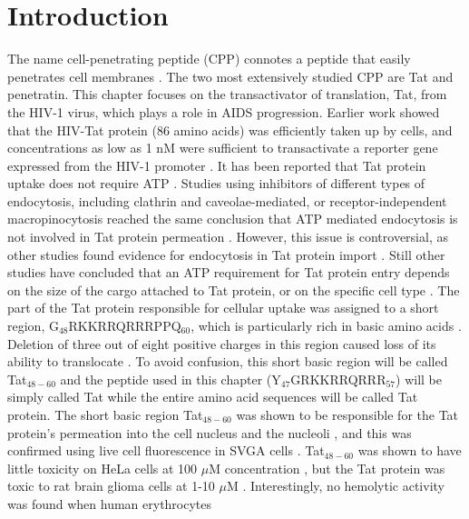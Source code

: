\section{Introduction}\label{sec:Tat_intro}
The name cell-penetrating peptide (CPP) connotes a peptide that 
easily penetrates cell membranes \cite{Fischer05,Joliot04,Lindgren00}. 
The two most extensively studied CPP are Tat and penetratin.
This chapter focuses on 
the transactivator of translation, Tat, from the HIV-1 virus, which plays a 
role in AIDS progression. Earlier work showed that the HIV-Tat 
protein (86 amino acids) was efficiently taken up by cells, and concentrations 
as low as 1 nM were sufficient to transactivate a reporter gene expressed from 
the HIV-1 promoter \cite{Frankel88,Green88}. 
It has been reported that Tat protein uptake does not 
require ATP \cite{Vives97}. 
Studies using inhibitors of different types of endocytosis, 
including clathrin and caveolae-mediated, or receptor-independent 
macropinocytosis reached the same conclusion that ATP mediated endocytosis is 
not involved in Tat protein permeation 
\cite{TerAvetisyan09,Duchardt07,Tunnemann06,Ziegler05}. 
However, this issue is 
controversial, as other studies found evidence for endocytosis in Tat protein 
import \cite{Wadia04,Kaplan05,Mann91,Richard05,Jones05,Vendeville04,Foerg05,Fittipaldi05,Liu00}. 
Still other studies have concluded that an ATP requirement for 
Tat protein entry depends on the size of the cargo attached to Tat protein, or 
on the specific cell type \cite{Torchilin01,Torchilin03,Rudolph03}. 
The part of the Tat protein responsible for 
cellular uptake was assigned to a short region, G$_{48}$RKKRRQRRRPPQ$_{60}$, 
which is particularly rich in basic amino acids \cite{Vives97}. 
Deletion of three out of 
eight positive charges in this region
caused loss of its ability to translocate \cite{Vives97}. 
To avoid confusion, this short basic region will be called Tat$_{48-60}$
and the peptide used in this chapter (Y$_{47}$GRKKRRQRRR$_{57}$)
will be simply called Tat while the entire amino acid sequences will
be called Tat protein.
The short basic region Tat$_{48-60}$ was shown to be responsible for the Tat
protein’s permeation into the cell nucleus and the nucleoli \cite{Vives97}, 
and this was confirmed using live cell fluorescence in SVGA cells \cite{Chauhan07}. 
Tat$_{48-60}$ was shown to have little toxicity on HeLa cells at 100 $\mu$M 
concentration \cite{Vives97}, but the Tat protein was toxic 
to rat brain glioma cells at 1-10 $\mu$M \cite{Sabatier91}. 
Interestingly, no hemolytic activity was found when human erythrocytes
